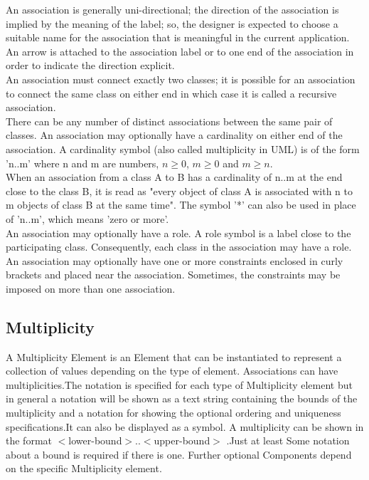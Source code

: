 { An association is generally uni-directional; the direction of the association is implied by the meaning of the label; so, the designer is expected to choose a suitable name for the association that is meaningful in the current application.\\
 
 An arrow is attached to the association label or to one end of the association in order to indicate the direction explicit.\\
 
 An association must connect exactly two classes; it is possible for an association to connect the same class on either end in which case it is called a recursive association.\\
 
  There can be any number of distinct associations between the same pair of classes. An association may optionally have a cardinality on either end of the association. A cardinality symbol (also called multiplicity in UML) is of the form 'n..m' where n and m are numbers, $n \geq 0$, $m \geq 0$ and $m \geq n$.\\
  
  When an association from a class A to B has a cardinality of n..m at the end close to the class B, it is read as "every object of class A is associated with n to m objects of class B at the same time". The symbol '*' can also be used in place of 'n..m', which means 'zero or more'.\\
  
  An association may optionally have a role. A role symbol is a label close to the participating class. Consequently, each class in the association may have a role.\\
  An association may optionally have one or more constraints enclosed in curly brackets and placed near the association. Sometimes, the constraints may be imposed on more than one association. 
  \cite{OMG-UML_Assocations}
  
\subsection{Multiplicity}
A Multiplicity Element is an Element that can be instantiated to represent a collection of values depending on the type of element. Associations can have multiplicities.The notation is specified for each type of Multiplicity element but in general a notation will be shown as a text string containing the bounds of the multiplicity and a notation for showing the optional ordering and uniqueness specifications.It can also be displayed as a symbol. A multiplicity can be shown in the format $<$lower-bound$>$..$<$upper-bound$>$ .Just at least Some notation about a bound is required if there is one. Further optional Components depend on the specific Multiplicity element.\cite{OMG-UML_Multiplicity}
}
